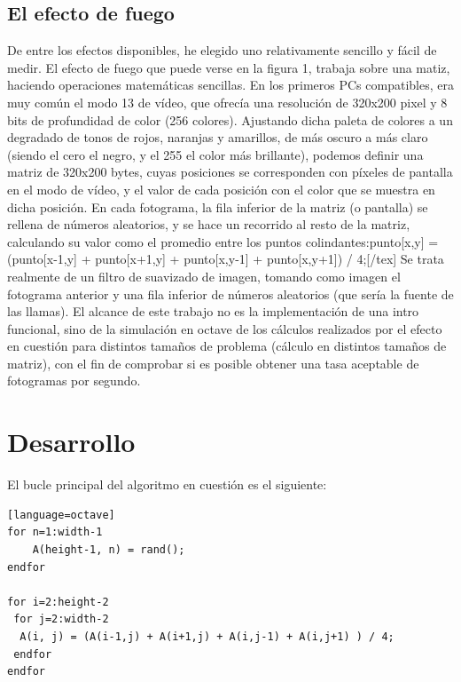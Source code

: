 \documentclass[a4,12pt]{article}
\begin{document}
\subsection{El efecto de fuego}
De entre los efectos disponibles, he elegido uno relativamente sencillo y fácil de medir. El efecto de fuego que puede verse en la figura 1, trabaja sobre una matiz, haciendo operaciones matemáticas sencillas. En los primeros PCs compatibles, era muy común el modo 13 de vídeo, que ofrecía una resolución de 320x200 pixel y 8 bits de profundidad de color (256 colores). Ajustando dicha paleta de colores a un degradado de tonos de rojos, naranjas y amarillos, de más oscuro a más claro (siendo el cero el negro, y el 255 el color más brillante), podemos definir una matriz de 320x200 bytes, cuyas posiciones se corresponden con píxeles de pantalla en el modo de vídeo, y el valor de cada posición con el color que se muestra en dicha posición.
\newline
\newline
En cada fotograma, la fila inferior de la matriz (o pantalla) se rellena de números aleatorios, y se hace un recorrido al resto de la matriz, calculando su valor como el promedio entre los puntos colindantes:\newline
[tex]punto[x,y] = (punto[x-1,y] + punto[x+1,y] + punto[x,y-1] + punto[x,y+1]) / 4;[/tex] \newline
Se trata realmente de un filtro de suavizado de imagen, tomando como imagen el fotograma anterior y una fila inferior de números aleatorios (que sería la fuente de las llamas).
\newline
\newline
El alcance de este trabajo no es la implementación de una intro funcional, sino de la simulación en octave de los cálculos realizados por el efecto en cuestión para distintos tamaños de problema (cálculo en distintos tamaños de matriz), con el fin de comprobar si es posible obtener una tasa aceptable de fotogramas por segundo.

\section{Desarrollo}

El bucle principal del algoritmo en cuestión es el siguiente:
\bigskip
\lstset{language=Octave}
\begin{lstlisting}[frame=single][language=octave]
for n=1:width-1
	A(height-1, n) = rand();
endfor

for i=2:height-2
 for j=2:width-2
  A(i, j) = (A(i-1,j) + A(i+1,j) + A(i,j-1) + A(i,j+1) ) / 4;
 endfor
endfor
\end{lstlisting}
\end{document}
